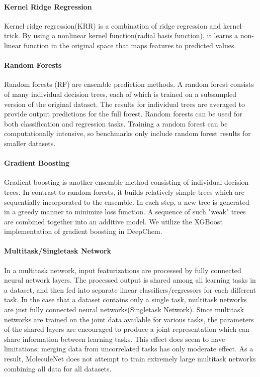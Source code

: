\paragraph{Kernel Ridge Regression}

Kernel ridge regression(KRR) is a combination of ridge regression and kernel trick. By using a nonlinear kernel function(radial basis function), it learns a non-linear function in the original space that maps features to predicted values.

\paragraph{Random Forests}

Random forests (RF) are ensemble prediction methods.\cite{breiman2001random} A random forest consists of many individual decision trees, each of which is trained on a subsampled version of the original dataset. The results for individual trees are averaged to provide output predictions for the full forest. Random forests can be used for both classification and regression tasks. Training a random forest can be computationally intensive, so benchmarks only include random forest results for smaller datasets.

\paragraph{Gradient Boosting}

Gradient boosting is another ensemble method consisting of individual decision trees.\cite{friedman2001greedy} In contrast to random forests, it builds relatively simple trees which are sequentially incorporated to the ensemble. In each step, a new tree is generated in a greedy manner to minimize loss function. A sequence of such "weak" trees are combined together into an additive model. We utilize the XGBoost implementation of gradient boosting in DeepChem.\cite{XGBoost}

\paragraph{Multitask/Singletask Network}

In a multitask network,\cite{ramsundar2015massively} input featurizations are processed by fully connected neural network layers. The processed output is shared among all learning tasks in a dataset, and then fed into separate linear classifiers/regressors for each different task. In the case that a dataset contains only a single task, multitask networks are just fully connected neural networks(Singletask Network). Since multitask networks are trained on the joint data available for various tasks, the parameters of the shared layers are encouraged to produce a joint representation which can share information between learning tasks. This effect does seem to have limitations; merging data from uncorrelated tasks has only moderate effect.\cite{kearnes2016modeling} As a result, MoleculeNet does not attempt to train extremely large multitask networks combining all data for all datasets.

